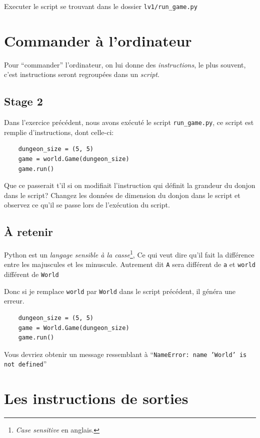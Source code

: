 \documentclass[12pt,a4paper]{report}
\newcommand{\path}[1]{\texttt{#1}}
\newcommand{\codeintext}[1]{\texttt{#1}}
\begin{document}
Executer le script se trouvant dans le dossier \path{lv1/run\_game.py}

\section{Commander à l'ordinateur}

Pour ``commander'' l’ordinateur, on lui donne des \emph{instructions}, le plus souvent, c’est instructions seront regroupées dans un \emph{script}.

\subsection{Stage 2}

Dans l’exercice précédent, nous avons exécuté le script \path{run\_game.py}, ce script est remplie d’instructions, dont celle-ci:

\begin{lstlisting}
    dungeon_size = (5, 5)
    game = world.Game(dungeon_size)
    game.run()
\end{lstlisting}

Que ce passerait t’il si on modifiait l’instruction qui définit la grandeur du donjon dans le script?
Changez les données de dimension du donjon dans le script et observez ce qu'il se passe lors de l'exécution du script.

\subsection{\`{A} retenir}

Python est un \emph{langage sensible à la casse}\footnote{\textit{Case sensitive} en anglais.}, Ce qui veut dire qu'il fait la différence entre les majuscules et les minuscule. Autrement dit \codeintext{A} sera différent de \codeintext{a} et \codeintext{world} différent de \codeintext{World}

Donc si je remplace \codeintext{world} par \codeintext{World} dans le script précédent, il généra une erreur.

\begin{lstlisting}
    dungeon_size = (5, 5)
    game = World.Game(dungeon_size)
    game.run()
\end{lstlisting}

Vous devriez obtenir un message ressemblant à ``\codeintext{NameError: name 'World' is not defined}''

\section{Les instructions de sorties}
\end{document}
